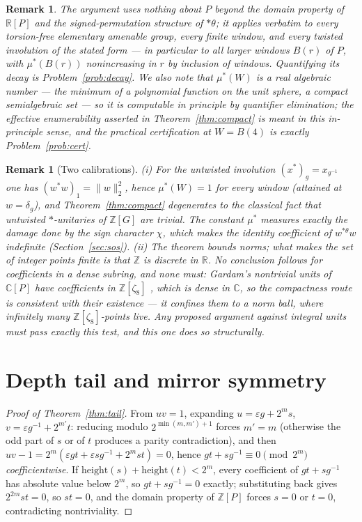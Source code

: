 \documentclass[10pt,a4paper]{amsart}
\newtheorem{remark}[theorem]{Remark}
\newcommand{\ZZ}{\mathbb{Z}}
\newcommand{\RR}{\mathbb{R}}
\newcommand{\thst}{{*\theta}}
\newcommand{\hgt}{\mathrm{height}}
\begin{document}
\begin{remark}\label{rem:general}
The argument uses nothing about $P$ beyond the domain property of
$\RR[P]$ and the signed-permutation structure of $\thst$; it applies
verbatim to every torsion-free elementary amenable group, every
finite window, and every twisted involution of the stated form ---
in particular to all larger windows $B(r)$ of $P$, with
$\mu^*(B(r))$ nonincreasing in $r$ by inclusion of windows.
Quantifying its decay is Problem~\ref{prob:decay}.  We also note that
$\mu^*(W)$ is a real algebraic number --- the minimum of a polynomial
function on the unit sphere, a compact semialgebraic set --- so it is
computable in principle by quantifier elimination; the effective
enumerability asserted in Theorem~\ref{thm:compact} is meant in this
in-principle sense, and the practical certification at $W=B(4)$ is
exactly Problem~\ref{prob:cert}.
\end{remark}

\begin{remark}[Two calibrations]\label{rem:untwisted}
(i) For the \emph{untwisted} involution $(x^*)_g=x_{g^{-1}}$ one has
$(w^*w)_1=\|w\|_2^2$, hence $\mu^*(W)=1$ for every window (attained at
$w=\delta_g$), and Theorem~\ref{thm:compact} degenerates to the
classical fact that untwisted $*$-unitaries of $\ZZ[G]$ are trivial.
The constant $\mu^*$ measures exactly the damage done by the sign
character $\chi$, which makes the identity coefficient of $w^{\thst}w$
indefinite (Section~\ref{sec:sos}).  (ii) The theorem bounds
\emph{norms}; what makes the set of integer points finite is that
$\ZZ$ is \emph{discrete} in $\RR$.  No conclusion follows for
coefficients in a dense subring, and none must: Gardam's nontrivial
units of $\mathbb{C}[P]$ have coefficients in $\ZZ[\zeta_8]$
\cite{GardamComplex2023}, which is dense in $\mathbb{C}$, so the
compactness route is consistent with their existence --- it confines
them to a norm ball, where infinitely many $\ZZ[\zeta_8]$-points
live.  Any proposed argument against integral units must pass exactly
this test, and this one does so structurally.
\end{remark}

\section{Depth tail and mirror symmetry}\label{sec:tail}

\begin{proof}[Proof of Theorem~\ref{thm:tail}]
From $uv=1$, expanding $u=\varepsilon g+2^ms$,
$v=\varepsilon g^{-1}+2^{m'}t$: reducing modulo $2^{\min(m,m')+1}$
forces $m'=m$ (otherwise the odd part of $s$ or of $t$ produces a
parity contradiction), and then
$uv-1=2^m(\varepsilon gt+\varepsilon sg^{-1}+2^mst)=0$, hence
$gt+sg^{-1}\equiv 0 \pmod{2^m}$ \emph{coefficientwise}.  If
$\hgt(s)+\hgt(t)<2^m$, every coefficient of $gt+sg^{-1}$ has absolute
value below $2^m$, so $gt+sg^{-1}=0$ exactly; substituting back gives
$2^{2m}st=0$, so $st=0$, and the domain property of $\ZZ[P]$
\cite{KLM} forces $s=0$ or $t=0$, contradicting nontriviality.
\end{proof}
\end{document}
